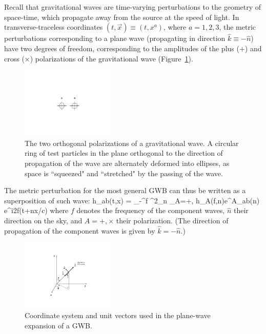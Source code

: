 Recall that gravitational waves are time-varying 
perturbations to the geometry of space-time, 
which propagate away from the source at the speed 
of light.
In transverse-traceless coordinates
$(t,\vec x)\equiv (t,x^a)$, where $a=1,2,3$,
the metric perturbations corresponding to a 
plane wave (propagating in direction $\hat k\equiv-\hat n$) 
have two degrees of freedom, corresponding to the 
amplitudes of the 
plus ($+$) and cross ($\times$) polarizations of
the gravitational wave (Figure~\ref{f:polarizations}).
%
\begin{figure}[htbp!]
\begin{center}
\includegraphics[width=0.4\textwidth]{Figures/polarizations}
\caption{The two orthogonal polarizations of a gravitational wave.
A circular ring of test particles in the plane orthogonal to 
the direction of propagation of the wave are alternately deformed
into ellipses, as space is ``squeezed" and ``stretched" by the 
passing of the wave.}
\label{f:polarizations}
\end{center}
\end{figure}
%
The metric perturbation for the most general GWB 
can thus be written as a superposition of such 
wave:
%
\be
h_{ab}(t,\vec x) =
\int_{-\infty}^\infty \D f\>
\int \D^2\Omega_{\hat n}\>
\sum_{A=+,\times}
h_A(f,\hat n)e^A_{ab}(\hat n) 
e^{i2\pi f(t+\hat n\cdot \vec x/c)}
\label{e:planewave}
\ee
%
where $f$ denotes the frequency of the 
component waves, $\hat n$ their direction on the
sky, and $A=+,\times$ their polarization.
(The direction of propagation of the component
waves is given by $\hat k=-\hat n$.)
%
\begin{figure}[htbp!]
\begin{center}
\includegraphics[width=0.4\textwidth]{Figures/plane_wave}
\caption{Coordinate system and unit vectors used in the 
plane-wave expansion of a GWB.}
\label{f:plane_wave}
\end{center}
\end{figure}
